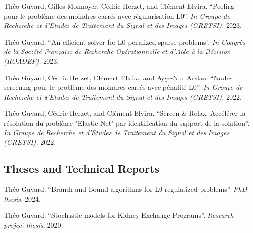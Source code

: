 \begin{etaremune}
    \item Théo Guyard, Gilles Monnoyer, Cédric Herzet,  and Clément Elvira. ``Peeling pour le problème des moindres carrés avec régularisation L0''. \textit{In Groupe de Recherche et d'Etudes de Traitement du Signal et des Images (GRETSI).} 2023.
    \item Théo Guyard. ``An efficient solver for L0-penalized sparse problems''. \textit{In Congrès de la Société Française de Recherche Opérationnelle et d'Aide à la Décision (ROADEF).} 2023.
    \item Théo Guyard, Cédric Herzet, Clément Elvira, and Ay\c{s}e-Nur Arslan. ``Node-screening pour le problème des moindres carrés avec pénalité L0''. \textit{In Groupe de Recherche et d'Etudes de Traitement du Signal et des Images (GRETSI).} 2022.
    \item Théo Guyard, Cédric Herzet, and Clément Elvira. ``Screen \& Relax: Accélérer la résolution du problème "Elastic-Net" par identification du support de la solution''. \textit{In Groupe de Recherche et d'Etudes de Traitement du Signal et des Images (GRETSI).} 2022.
\end{etaremune}


\subsection*{Theses and Technical Reports}
\label{publications:theses-and-technical-reports}

\begin{etaremune}
    \item Théo Guyard. ``Branch-and-Bound algorithms for L0-regularized problems''. \textit{PhD thesis.} 2024.
    \item Théo Guyard. ``Stochastic models for Kidney Exchange Programs''. \textit{Research project thesis.} 2020.
\end{etaremune}




